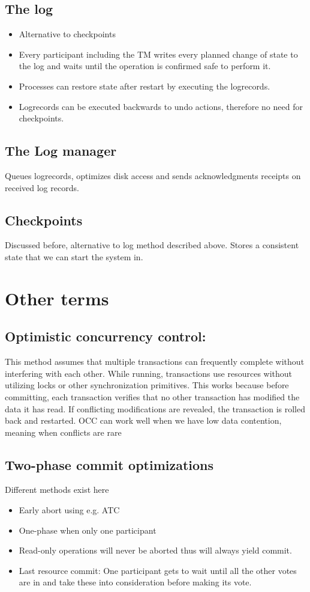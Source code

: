 \subsection{The log}
\begin{itemize}
\item Alternative to checkpoints
\item Every participant including the TM writes every planned change of state to the log and waits until the operation is confirmed safe to perform it. 
\item Processes can restore state after restart by executing the logrecords.
\item Logrecords can be executed backwards to undo actions, therefore no need for checkpoints.
\end{itemize}

\subsection{The Log manager}
Queues logrecords, optimizes disk access and sends acknowledgments receipts on received log records.

\subsection{Checkpoints}
Discussed before, alternative to log method described above. Stores a consistent state that we can start the system in.

\section{Other terms}
\subsection{Optimistic concurrency control:}
This method assumes that multiple transactions can frequently complete without interfering with each other. While running, transactions use resources without utilizing locks or other synchronization primitives. This works because before committing, each transaction verifies that no other transaction has modified the data it has read. If conflicting modifications are revealed, the transaction is rolled back and restarted. OCC can work well when we have low data contention, meaning when conflicts are rare

\subsection{Two-phase commit optimizations}
Different methods exist here
\begin{itemize}
\item Early abort using e.g. ATC
\item One-phase when only one participant
\item Read-only operations will never be aborted thus will always yield commit.
\item Last resource commit: One participant gets to wait until all the other votes are in and take these into consideration before making its vote.
\end{itemize}

